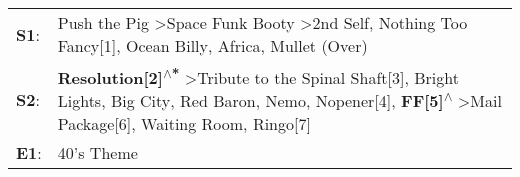 \begin{supertabular}{p{0.03\textwidth}p{0.92\textwidth}}
 \textbf{S1}:  &                                                                                                                                                                       Push the Pig\textsuperscript{} \textgreater \enspace Space Funk Booty\textsuperscript{} \textgreater \enspace 2nd Self\textsuperscript{}, \enspace Nothing Too Fancy[1]\textsuperscript{}, \enspace Ocean Billy\textsuperscript{}, \enspace Africa\textsuperscript{}, \enspace Mullet (Over)\textsuperscript{}  \enspace  \\
 \textbf{S2}:  &  \textbf{Resolution[2]\textsuperscript{$\wedge$*}} \textgreater \enspace Tribute to the Spinal Shaft[3]\textsuperscript{}, \enspace Bright Lights, Big City\textsuperscript{}, \enspace Red Baron\textsuperscript{}, \enspace Nemo\textsuperscript{}, \enspace Nopener[4]\textsuperscript{}, \enspace \textbf{FF[5]\textsuperscript{$\wedge$}} \textgreater \enspace Mail Package[6]\textsuperscript{}, \enspace Waiting Room\textsuperscript{}, \enspace Ringo[7]\textsuperscript{}  \enspace  \\
 \textbf{E1}:  &                                                                                                                                                                                                                                                                                                                                                                                                                                                         40's Theme\textsuperscript{}  \enspace  \\
\end{supertabular}

